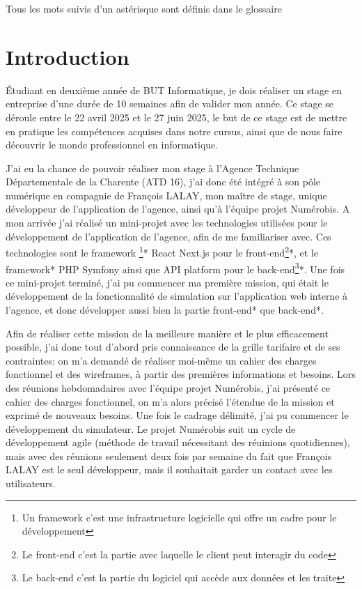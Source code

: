 \documentclass[a4paper,12pt]{report}
\begin{document}
\newpage
\thispagestyle{empty}
\vspace*{\fill}            
\begin{center}             
Tous les mots suivis d'un astérisque sont définis dans le glossaire
\end{center}
\vspace*{\fill}            


\chapter{Introduction}         
Étudiant en deuxième année de BUT Informatique, je dois réaliser un stage en entreprise d'une durée de 10 semaines afin de valider mon année. Ce stage se déroule entre le 22 avril 2025 et le 27 juin 2025, le but de ce stage est de mettre en pratique les compétences acquises dans notre cursus, ainsi que de nous faire découvrir le monde professionnel en informatique.

\vspace{1em}

J'ai eu la chance de pouvoir réaliser mon stage à l'Agence Technique Départementale de la Charente (ATD 16), j'ai donc été intégré à son pôle numérique en compagnie de François LALAY, mon maître de stage, unique développeur de l'application de l'agence, ainsi qu'à l'équipe projet Numérobis. A mon arrivée j'ai réalisé un mini-projet avec les technologies utilisées pour le développement de l'application de l'agence, afin de me familiariser avec. Ces technologies sont le framework \footnote{Un framework c'est une infrastructure logicielle qui offre un cadre pour le développement}* React Next.js pour le front-end\footnote{Le front-end c'est la partie avec laquelle le client peut interagir du code}*, et le framework* PHP Symfony ainsi que API platform pour le back-end\footnote{Le back-end c'est la partie du logiciel qui accède aux données et les traite}*. Une fois ce mini-projet terminé, j'ai pu commencer ma première mission, qui était le développement de la fonctionnalité de simulation sur l'application web interne à l'agence, et donc développer aussi bien la partie front-end* que back-end*.

\vspace{1em}

Afin de réaliser cette mission de la meilleure manière et le plus efficacement possible, j'ai donc tout d'abord pris connaissance de la grille tarifaire et de ses contraintes: on m'a demandé de réaliser moi-même un cahier des charges fonctionnel et des wireframes, à partir des premières informations et besoins. Lors des réunions hebdomadaires avec l'équipe projet Numérobis, j'ai présenté ce cahier des charges fonctionnel, on m'a alors précisé l'étendue de la mission et exprimé de nouveaux besoins. Une fois le cadrage délimité, j'ai pu commencer le développement du simulateur. Le projet Numérobis suit un cycle de développement agile (méthode de travail nécessitant des réuinions quotidiennes), 
mais avec des réunions seulement deux fois par semaine du fait que François LALAY est le seul développeur, mais il souhaitait garder un contact avec les utilisateurs.
\end{document}
